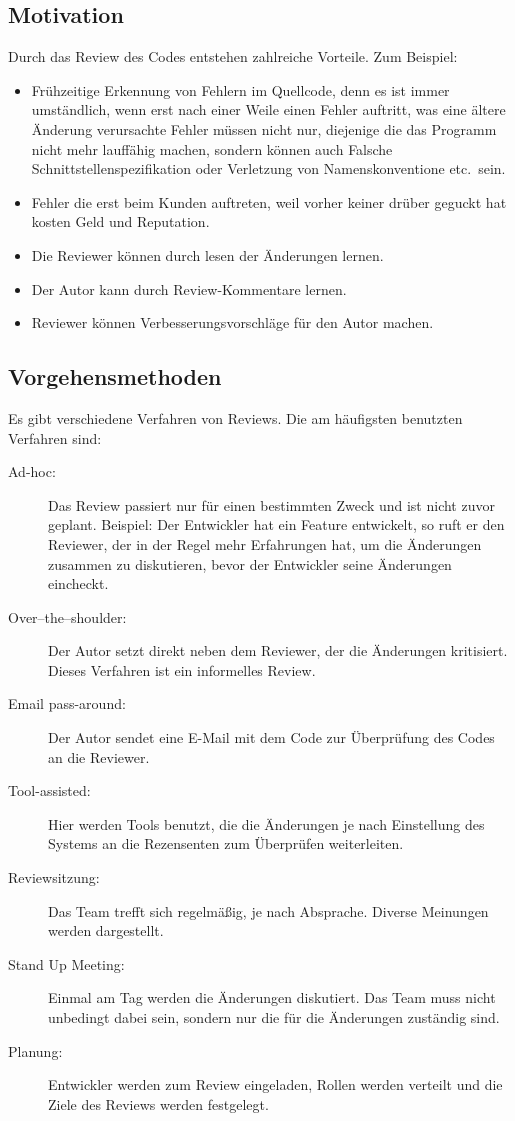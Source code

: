 \subsection{Motivation}
\label{subsec:Gründe}
Durch das Review des Codes entstehen zahlreiche Vorteile. Zum Beispiel:

\begin{itemize}
	\item Frühzeitige Erkennung von Fehlern im Quellcode, denn es ist immer umständlich, wenn erst nach einer Weile einen Fehler auftritt, was eine ältere Änderung verursachte
		Fehler müssen nicht nur, diejenige die das Programm nicht mehr lauffähig machen, sondern können auch Falsche Schnittstellenspezifikation oder Verletzung von Namenskonventione 
		etc.\ sein.
	\item Fehler die erst beim Kunden auftreten, weil vorher keiner drüber geguckt hat kosten Geld und Reputation.
	\item Die Reviewer können durch lesen der Änderungen lernen.
	\item Der Autor kann durch Review-Kommentare lernen.
	\item Reviewer können Verbesserungsvorschläge für den Autor machen.
\end{itemize}

\subsection{Vorgehensmethoden}
\label{subsec:Vorgehensmethoden}
Es gibt verschiedene Verfahren von Reviews. Die am häufigsten benutzten Verfahren sind:

\begin{description}
	\item [Ad-hoc:] Das Review passiert nur für einen bestimmten Zweck und ist nicht zuvor geplant. Beispiel: Der Entwickler hat ein Feature entwickelt, so ruft er den Reviewer, der in 				der Regel mehr Erfahrungen hat, um die Änderungen zusammen zu diskutieren, bevor der Entwickler seine Änderungen eincheckt.
	\item [Over–the–shoulder:] Der Autor setzt direkt neben dem Reviewer, der die Änderungen kritisiert. Dieses Verfahren ist ein informelles Review.
	\item [Email pass-around:] Der Autor sendet eine E-Mail mit dem Code zur Überprüfung des Codes an die Reviewer.
	\item [Tool-assisted:] Hier werden Tools benutzt, die die Änderungen je nach Einstellung des Systems an die Rezensenten zum Überprüfen weiterleiten.
	\item [Reviewsitzung:] Das Team trefft sich regelmäßig, je nach Absprache. Diverse Meinungen werden dargestellt.
	\item [Stand Up Meeting:] Einmal am Tag werden die Änderungen diskutiert. Das Team muss nicht unbedingt dabei sein, sondern nur die für die Änderungen zuständig sind.
	\item [Planung:] Entwickler werden zum Review eingeladen, Rollen werden verteilt und die Ziele des Reviews werden festgelegt.
\end{description}

